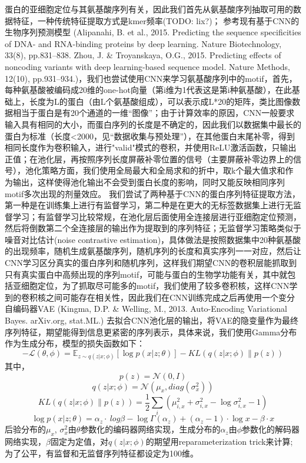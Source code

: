 \documentclass[a4paper,UTF8]{article}
\begin{document}
蛋白的亚细胞定位与其氨基酸序列有关，因此我们首先从氨基酸序列抽取可用的数据特征，一种传统特征提取方式是kmer频率(TODO: lix?)；
参考现有基于CNN的生物序列预测模型 (Alipanahi, B. et al., 2015. Predicting the sequence specificities of DNA- and RNA-binding proteins by deep learning. Nature Biotechnology, 33(8), pp.831–838. Zhou, J. & Troyanskaya, O.G., 2015. Predicting effects of noncoding variants with deep learning-based sequence model. Nature Methods, 12(10), pp.931–934.)，我们也尝试使用CNN来学习氨基酸序列中的motif，首先，每种氨基酸被编码成20维的one-hot向量（第i维为1代表这是第i种氨基酸），在此基础上，长度为L的蛋白（由L个氨基酸组成），可以表示成L*20的矩阵，类比图像数据相当于蛋白是有20个通道的一维“图像”；由于计算效率的原因，CNN一般要求输入具有相同的大小，而蛋白序列的长度是不确定的，因此我们以数据集中最长的蛋白为标准（长度<2000，见“数据收集与预处理”），在其他蛋白末尾补零，得到相同长度作为卷积输入，进行"valid"模式的卷积，并使用ReLU激活函数，只输出正值；在池化层，再按照序列长度屏蔽补零位置的信号（主要屏蔽补零边界上的信号），池化策略方面，我们使用全局最大和全局求和的折中，取k个最大值求和作为输出，这样使得池化输出不会受到蛋白长度的影响，同时又能反映相同序列motif多次出现的剂量效应。
我们尝试了两种基于CNN的蛋白序列特征提取方法，第一种是在训练集上进行有监督学习，第二种是在更大的无标签数据集上进行无监督学习；有监督学习比较常规，在池化层后面使用全连接层进行亚细胞定位预测，然后将倒数第二个全连接层的输出作为提取到的序列特征；无监督学习策略类似于噪音对比估计(noise contrastive estimation)，具体做法是按照数据集中20种氨基酸的出现频率，随机生成氨基酸序列，随机序列的长度和真实序列一一对应，然后让CNN学习区分真实的蛋白序列和随机序列，这样我们期望CNN的卷积层能抓取到只有真实蛋白中高频出现的序列motif，可能与蛋白的生物学功能有关，其中就包括亚细胞定位，为了抓取尽可能多的motif，我们使用了较多卷积核，这样CNN学到的卷积核之间可能存在相关性，因此我们在CNN训练完成之后再使用一个变分自编码器VAE (Kingma, D.P. & Welling, M., 2013. Auto-Encoding Variational Bayes. arXiv.org, stat.ML.) 去拟合CNN池化层的输出，将VAE的隐变量作为最终序列特征，期望能得到信息更紧密的序列表示，具体来说，我们使用Gamma分布作为生成分布，模型的损失函数如下：
$$-\mathcal L(\theta, \phi) = \mathbb E_{z \sim q(z|x;\phi)} [\log p(x|z;\theta)] - KL(q(z|x;\phi) \parallel p(z))$$
其中，
$$p(z)=\mathcal N(0, I)$$
$$q(z|x;\phi)=\mathcal N(\mu_x, diag(\sigma_x^2))$$
$$KL(q(z|x;\phi) \parallel p(z)) = \frac 1 2 \sum_i (\mu_{i,x}^2 + \sigma_{i,x}^2 - \log \sigma_{i,x}^2 - 1)$$
$$\log p(x|z;\theta)=\alpha_z \cdot\ log \beta - \log \Gamma(\alpha_z) + (\alpha_z - 1) \cdot \log x - \beta \cdot x$$
后验分布的$\mu_x$, $\sigma_x^2$由$\theta$参数化的编码器网络实现，$生成分布的\alpha_z$由$\phi$参数化的解码器网络实现，$\beta$固定为定值，对$q(z|x;\phi)$的期望用reparameterization trick来计算;
为了公平，有监督和无监督序列特征都设定为100维。
\end{document}
